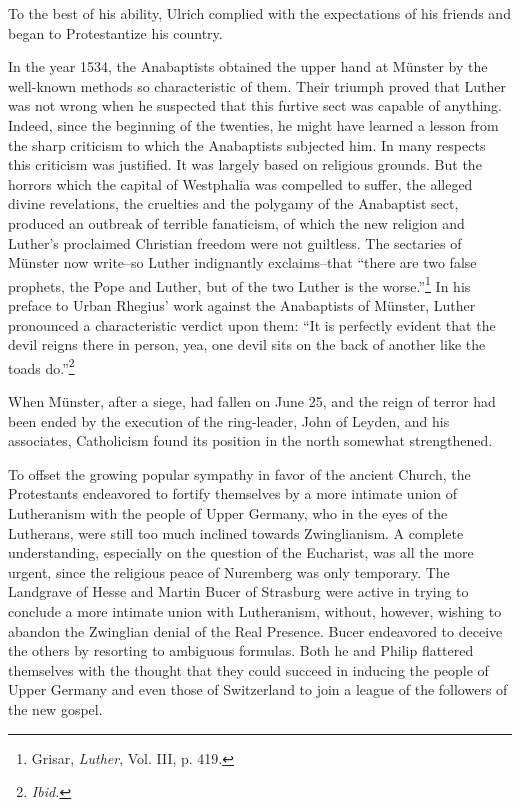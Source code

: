 To the best of his ability, Ulrich complied with the expectations of
his friends and began to Protestantize his country.

In the year 1534, the Anabaptists obtained the upper hand at
Münster by the well-known methods so characteristic of them. Their
triumph proved that Luther was not wrong when he suspected that
this furtive sect was capable of anything. Indeed, since the beginning
of the twenties, he might have learned a lesson from the sharp
criticism to which the Anabaptists subjected him. In many respects
this criticism was justified. It was largely based on religious grounds.
But the horrors which the capital of Westphalia was compelled to
suffer, the alleged divine revelations, the cruelties and the polygamy
of the Anabaptist sect, produced an outbreak of terrible fanaticism,
of which the new religion and Luther’s proclaimed Christian freedom
were not guiltless. The sectaries of Münster now write--so Luther
indignantly exclaims--that “there are two false prophets, the Pope
and Luther, but of the two Luther is the worse.”\footnote{Grisar, \textit{Luther}, Vol. III, p. 419.}
 In his preface to
Urban Rhegius’ work against the Anabaptists of Münster, Luther
pronounced a characteristic verdict upon them: “It is perfectly
evident that the devil reigns there in person, yea, one devil sits on
the back of another like the toads do.”\footnote{\textit{Ibid.}}

When Münster, after a siege, had fallen on June 25, and the reign
of terror had been ended by the execution of the ring-leader, John
of Leyden, and his associates, Catholicism found its position in the
north somewhat strengthened.

To offset the growing popular sympathy in favor of the ancient
Church, the Protestants endeavored to fortify themselves by a more
intimate union of Lutheranism with the people of Upper Germany,
who in the eyes of the Lutherans, were still too much inclined towards
Zwinglianism. A complete understanding, especially on the question
of the Eucharist, was all the more urgent, since the religious peace
of Nuremberg was only temporary. The Landgrave of Hesse and
Martin Bucer of Strasburg were active in trying to conclude a more
intimate union with Lutheranism, without, however, wishing to abandon
the Zwinglian denial of the Real Presence. Bucer endeavored
to deceive the others by resorting to ambiguous formulas. Both he
and Philip flattered themselves with the thought that they could succeed
in inducing the people of Upper Germany and even those of
Switzerland to join a league of the followers of the new gospel.

